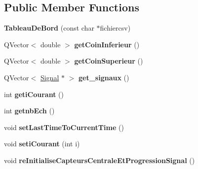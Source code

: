 \subsection*{Public Member Functions}
\begin{DoxyCompactItemize}
\item 
\hypertarget{class_tableau_de_bord_ab371dfed23c16d5079be50321643c54e}{{\bfseries Tableau\-De\-Bord} (const char $\ast$fichiercsv)}\label{class_tableau_de_bord_ab371dfed23c16d5079be50321643c54e}

\item 
\hypertarget{class_tableau_de_bord_aaef4af7a18ae28d98d1faef2a5fd43a1}{Q\-Vector$<$ double $>$ {\bfseries get\-Coin\-Inferieur} ()}\label{class_tableau_de_bord_aaef4af7a18ae28d98d1faef2a5fd43a1}

\item 
\hypertarget{class_tableau_de_bord_a63e1e41a76124e654ffb833c43ba6126}{Q\-Vector$<$ double $>$ {\bfseries get\-Coin\-Superieur} ()}\label{class_tableau_de_bord_a63e1e41a76124e654ffb833c43ba6126}

\item 
\hypertarget{class_tableau_de_bord_a6c552365c5a2bb0f7254308f7cc00b26}{Q\-Vector$<$ \hyperlink{class_signal}{Signal} $\ast$ $>$ {\bfseries get\-\_\-signaux} ()}\label{class_tableau_de_bord_a6c552365c5a2bb0f7254308f7cc00b26}

\item 
\hypertarget{class_tableau_de_bord_a055bee95488a92470d196778b2a819ed}{int {\bfseries geti\-Courant} ()}\label{class_tableau_de_bord_a055bee95488a92470d196778b2a819ed}

\item 
\hypertarget{class_tableau_de_bord_a4ab3ebd44ff113f0d515e2c866e9146e}{int {\bfseries getnb\-Ech} ()}\label{class_tableau_de_bord_a4ab3ebd44ff113f0d515e2c866e9146e}

\item 
\hypertarget{class_tableau_de_bord_a9b391bc1184de15a321ebc118b3a512b}{void {\bfseries set\-Last\-Time\-To\-Current\-Time} ()}\label{class_tableau_de_bord_a9b391bc1184de15a321ebc118b3a512b}

\item 
\hypertarget{class_tableau_de_bord_abc48ad8127c1f2f04f2780f519ab1ff6}{void {\bfseries seti\-Courant} (int i)}\label{class_tableau_de_bord_abc48ad8127c1f2f04f2780f519ab1ff6}

\item 
\hypertarget{class_tableau_de_bord_a9233b049130f2d1490c2f7978d29418e}{void {\bfseries re\-Initialise\-Capteurs\-Centrale\-Et\-Progression\-Signal} ()}\label{class_tableau_de_bord_a9233b049130f2d1490c2f7978d29418e}


\end{DoxyCompactItemize}
